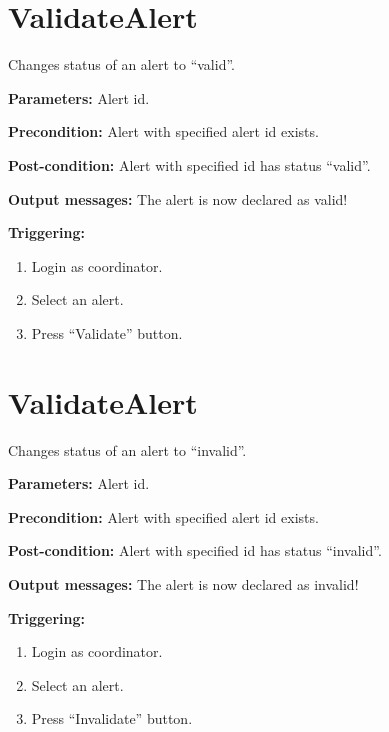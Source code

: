 \section{ValidateAlert}
\label{operation:ValidateAlert}
Changes status of an alert to ``valid''.

\begin{description}

\item \textbf{Parameters:} Alert id.
\item \textbf{Precondition:} Alert with specified alert id exists.
\item \textbf{Post-condition:} Alert with specified id has status ``valid''.

\item \textbf{Output messages:} The alert is now declared as valid!

\item \textbf{Triggering:}
\begin{enumerate}
\item Login as coordinator.
\item Select an alert.
\item Press ``Validate'' button.
\end{enumerate}
 
\end{description}

\section{ValidateAlert}
\label{operation:ValidateAlert}
Changes status of an alert to ``invalid''.

\begin{description}

\item \textbf{Parameters:} Alert id.
\item \textbf{Precondition:} Alert with specified alert id exists.
\item \textbf{Post-condition:} Alert with specified id has status ``invalid''.

\item \textbf{Output messages:} The alert is now declared as invalid!

\item \textbf{Triggering:}
\begin{enumerate}
\item Login as coordinator.
\item Select an alert.
\item Press ``Invalidate'' button.
\end{enumerate}
 
\end{description}

